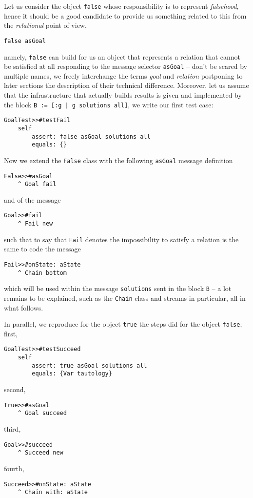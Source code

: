 \documentclass[a4paper,12pt]{article}
\begin{document}
Let us consider the object \Verb|false| whose responsibility is to represent
\textit{falsehood}, hence it should be a good candidate to provide us something
related to this from the \textit{relational} point of view,
\begin{verbatim}
false asGoal
\end{verbatim}
namely, \Verb|false| can build for us an object that represents a relation that
cannot be satisfied at all responding to the message selector \Verb|asGoal| --
don't be scared by multiple names, we freely interchange the terms
\textit{goal} and \textit{relation} postponing to later sections the
description of their technical difference. Moreover, let us
assume that the infrastructure that actually builds results is given and implemented
by the block \texttt{B := [:g | g solutions all]}, we write our first test case:
\begin{verbatim}
GoalTest>>#testFail
    self
        assert: false asGoal solutions all
        equals: {}
\end{verbatim}
Now we extend the \Verb|False| class with the following \Verb|asGoal| message
definition
\begin{verbatim}
False>>#asGoal
    ^ Goal fail
\end{verbatim}
and of the message
\begin{verbatim}
Goal>>#fail
    ^ Fail new
\end{verbatim}
such that to say that \verb|Fail| denotes the impossibility to satisfy a relation
is the same to code the message
\begin{verbatim}
Fail>>#onState: aState
    ^ Chain bottom
\end{verbatim}
which will be used within the message \Verb|solutions| sent in the block
\Verb|B| -- a lot remains to be explained, such as the \Verb|Chain| class and
streams in particular, all in what follows.

In parallel, we reproduce for the object \Verb|true| the steps did for
the object \Verb|false|; first,
\begin{verbatim}
GoalTest>>#testSucceed
    self
        assert: true asGoal solutions all
        equals: {Var tautology}
\end{verbatim}
second,
\begin{verbatim}
True>>#asGoal
    ^ Goal succeed
\end{verbatim}
third,
\begin{verbatim}
Goal>>#succeed
    ^ Succeed new
\end{verbatim}
fourth,
\begin{verbatim}
Succeed>>#onState: aState
    ^ Chain with: aState
\end{verbatim}
\end{document}
